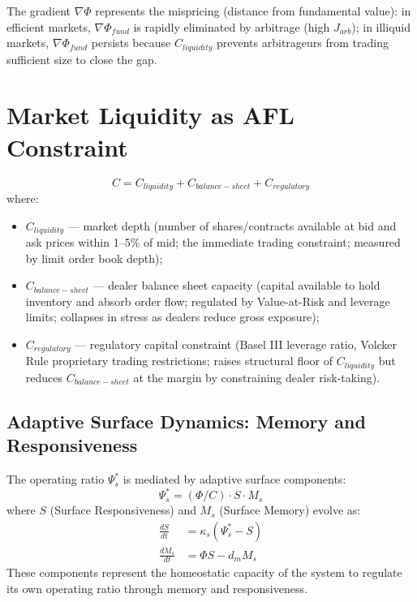 \documentclass[11pt]{article}
\begin{document}
The gradient $\nabla\Phi$ represents the mispricing (distance from fundamental value): in
efficient markets, $\nabla\Phi_{fund}$ is rapidly eliminated by arbitrage (high $J_{arb}$);
in illiquid markets, $\nabla\Phi_{fund}$ persists because $C_{liquidity}$ prevents arbitrageurs
from trading sufficient size to close the gap.

\section{Market Liquidity as AFL Constraint}

\begin{equation}
C = C_{liquidity} + C_{balance-sheet} + C_{regulatory}
\end{equation}
where:
\begin{itemize}
    \item $C_{liquidity}$ --- market depth (number of shares/contracts available at bid and ask
          prices within 1--5\% of mid; the immediate trading constraint; measured by limit order
          book depth);
    \item $C_{balance-sheet}$ --- dealer balance sheet capacity (capital available to hold
          inventory and absorb order flow; regulated by Value-at-Risk and leverage limits;
          collapses in stress as dealers reduce gross exposure);
    \item $C_{regulatory}$ --- regulatory capital constraint (Basel III leverage ratio, Volcker
          Rule proprietary trading restrictions; raises structural floor of $C_{liquidity}$ but
          reduces $C_{balance-sheet}$ at the margin by constraining dealer risk-taking).
\end{itemize}

\subsection{Adaptive Surface Dynamics: Memory and Responsiveness}

The operating ratio $\Psi_s^*$ is mediated by adaptive surface components:
\begin{equation}
\Psi_s^* = (\Phi/C) \cdot S \cdot M_s
\end{equation}
where $S$ (Surface Responsiveness) and $M_s$ (Surface Memory) evolve as:
\begin{align}
\frac{dS}{dt} &= \kappa_s (\Psi_s^* - S) \\
\frac{dM_s}{dt} &= \Phi S - d_m M_s
\end{align}
These components represent the homeostatic capacity of the system to regulate its own operating ratio through memory and responsiveness.
\end{document}
